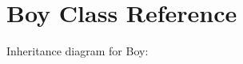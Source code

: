 \hypertarget{classBoy}{}\section{Boy Class Reference}
\label{classBoy}


Inheritance diagram for Boy\+:
